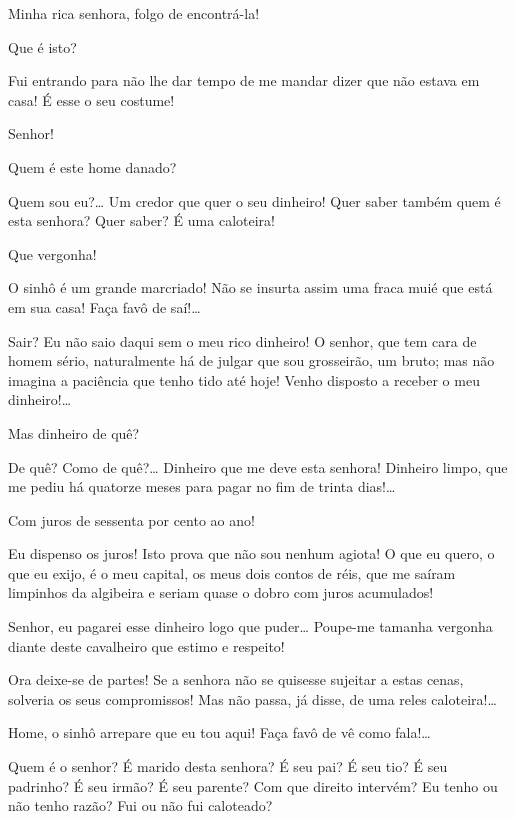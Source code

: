  Minha rica senhora, folgo de encontrá-la!

 Que é isto?

 Fui entrando para não lhe dar tempo de me mandar dizer que não
estava em casa! É esse o seu costume!

 Senhor!

 Quem é este home danado?

 Quem sou eu?\ldots{} Um credor que quer o seu dinheiro! Quer saber
também quem é esta senhora? Quer saber? É uma caloteira!

 Que vergonha! 

 O sinhô é um grande marcriado! Não se insurta assim uma fraca
muié que está em sua casa! Faça favô de saí!\ldots{}

 Sair? Eu não saio daqui sem o meu rico dinheiro! O senhor, que
tem cara de homem sério, naturalmente há de julgar que sou grosseirão, um
bruto; mas não imagina a paciência que tenho tido até hoje!  Venho disposto a receber o meu dinheiro!\ldots{}

 Mas dinheiro de quê?

 De quê? Como de quê?\ldots{} Dinheiro que me deve esta senhora!
Dinheiro limpo, que me pediu há quatorze meses para pagar no fim de trinta
dias!\ldots{}

  Com juros de sessenta por cento
ao ano!

 Eu dispenso os juros! Isto prova que não sou nenhum agiota! O
que eu quero, o que eu exijo, é o meu capital, os meus dois contos de réis, que me
saíram limpinhos da algibeira e seriam quase o dobro com juros acumulados!

  Senhor, eu pagarei esse dinheiro logo que puder\ldots{}
Poupe-me tamanha vergonha diante deste cavalheiro que estimo e respeito!

 Ora deixe-se de partes! Se a senhora não se quisesse sujeitar a
estas cenas, solveria os seus compromissos! Mas não passa, já disse, de uma reles
caloteira!\ldots{}

 Home, o sinhô arrepare que eu tou aqui! Faça favô de vê como
fala!\ldots{}

 Quem é o senhor? É marido desta senhora? É seu pai? É seu tio? É
seu padrinho? É seu irmão? É seu parente? Com que direito intervém? Eu
tenho ou não tenho razão? Fui ou não fui caloteado?

